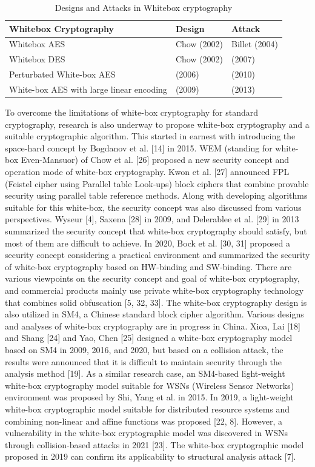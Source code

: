 \documentclass{ieeeaccess}
\begin{document}
\begin{table}
\caption{Designs and Attacks in Whitebox cryptography}
\label{table}
\setlength{\tabcolsep}{3pt}
\begin{tabular}{|p{120pt}|p{50pt}|p{50pt}|}
\hline
Whitebox Cryptography& 
Design& 
Attack \\
\hline
Whitebox AES & Chow (2002) & Billet (2004) \\
Whitebox DES & Chow (2002) & (2007) \\
Perturbated White-box AES & (2006) & (2010) \\
White-box AES with large linear encoding &
(2009) & (2013) \\
\hline
\end{tabular}
\label{tab1}
\end{table}

To overcome the limitations of white-box cryptography for standard cryptography, research is also underway to propose white-box cryptography and a suitable cryptographic algorithm. This started in earnest with introducing the space-hard concept by Bogdanov et al. [14] in 2015. WEM (standing for white-box Even-Mansuor) of Chow et al. [26] proposed a new security concept and operation mode of white-box cryptography. Kwon et al. [27] announced FPL (Feistel cipher using Parallel table Look-ups) block ciphers that combine provable security using parallel table reference methods. Along with developing algorithms suitable for this white-box, the security concept was also discussed from various perspectives. Wyseur [4], Saxena [28] in 2009, and Delerablee et al. [29] in 2013 summarized the security concept that white-box cryptography should satisfy, but most of them are difficult to achieve. In 2020, Bock et al. [30, 31] proposed a security concept considering a practical environment and summarized the security of white-box cryptography based on HW-binding and SW-binding. There are various viewpoints on the security concept and goal of white-box cryptography, and commercial products mainly use private white-box cryptography technology that combines solid obfuscation [5, 32, 33]. 
The white-box cryptography design is also utilized in SM4, a Chinese standard block cipher algorithm. Various designs and analyses of white-box cryptography are in progress in China. Xioa, Lai [18] and Shang [24] and Yao, Chen [25] designed a white-box cryptography model based on SM4 in 2009, 2016, and 2020, but based on a collision attack, the results were announced that it is difficult to maintain security through the analysis method [19]. As a similar research case, an SM4-based light-weight white-box cryptography model suitable for WSNs (Wireless Sensor Networks) environment was proposed by Shi, Yang et al. in 2015. In 2019, a light-weight white-box cryptographic model suitable for distributed resource systems and combining non-linear and affine functions was proposed [22, 8]. However, a vulnerability in the white-box cryptographic model was discovered in WSNs through collision-based attacks in 2021 [23]. The white-box cryptographic model proposed in 2019 can confirm its applicability to structural analysis attack [7]. 
\end{document}
